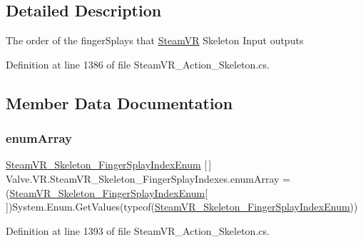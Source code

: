 \subsection{Detailed Description}
The order of the finger\+Splays that \mbox{\hyperlink{class_valve_1_1_v_r_1_1_steam_v_r}{Steam\+VR}} Skeleton Input outputs 



Definition at line 1386 of file Steam\+V\+R\+\_\+\+Action\+\_\+\+Skeleton.\+cs.



\subsection{Member Data Documentation}
\mbox{\label{class_valve_1_1_v_r_1_1_steam_v_r___skeleton___finger_splay_indexes_a2958ccd384d2746c80e59459fd8b63e2}} 
\subsubsection{\texorpdfstring{enumArray}{enumArray}}
{\footnotesize\ttfamily \mbox{\hyperlink{namespace_valve_1_1_v_r_a43c97e13fe46f0575986b9f74945e0bf}{Steam\+V\+R\+\_\+\+Skeleton\+\_\+\+Finger\+Splay\+Index\+Enum}} \mbox{[}$\,$\mbox{]} Valve.\+V\+R.\+Steam\+V\+R\+\_\+\+Skeleton\+\_\+\+Finger\+Splay\+Indexes.\+enum\+Array = (\mbox{\hyperlink{namespace_valve_1_1_v_r_a43c97e13fe46f0575986b9f74945e0bf}{Steam\+V\+R\+\_\+\+Skeleton\+\_\+\+Finger\+Splay\+Index\+Enum}}\mbox{[}$\,$\mbox{]})System.\+Enum.\+Get\+Values(typeof(\mbox{\hyperlink{namespace_valve_1_1_v_r_a43c97e13fe46f0575986b9f74945e0bf}{Steam\+V\+R\+\_\+\+Skeleton\+\_\+\+Finger\+Splay\+Index\+Enum}}))\hspace{0.3cm}{\ttfamily [static]}}



Definition at line 1393 of file Steam\+V\+R\+\_\+\+Action\+\_\+\+Skeleton.\+cs.

\mbox{\label{class_valve_1_1_v_r_1_1_steam_v_r___skeleton___finger_splay_indexes_a6c462c7f0e9bea5f567a5dfe950e6b55}} 
